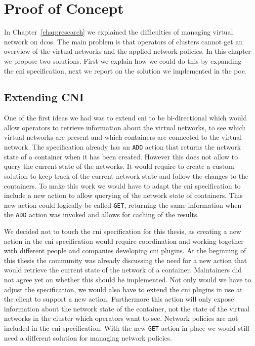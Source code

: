 \chapter{Proof of Concept}
\label{chap:proof-of-concept}
In Chapter~\ref{chap:research} we explained the difficulties of managing virtual network on \gls{dcos}. The main problem is that operators of clusters cannot get an overview of the virtual networks and the applied network policies. In this chapter we propose two solutions. First we explain how we could do this by expanding the \gls{cni} specification, next we report on the solution we implemented in the \gls{poc}. 

\section{Extending CNI}
\label{sec:expanding-cni}
One of the first ideas we had was to extend \gls{cni} to be bi-directional which would allow operators to retrieve information about the virtual networks, to see which virtual networks are present and which containers are connected to the virtual network. The specification already has an \texttt{ADD} action that returns the network state of a container when it has been created. However this does not allow to query the current state of the networks. It would require to create a custom solution to keep track of the current network state and follow the changes to the containers. To make this work we would have to adapt the \gls{cni} specification to include a new action to allow querying of the network state of containers. This new action could logically be called \texttt{GET}, returning the same information when the \texttt{ADD} action was invoked and allows for caching of the results.

We decided not to touch the \gls{cni} specification for this thesis, as creating a new action in the \gls{cni} specification would require coordination and working together with different people and companies developing \gls{cni} plugins. At the beginning of this thesis the community was already discussing the need for a new action that would retrieve the current state of the network of a container. Maintainers did not agree yet on whether this should be implemented. Not only would we have to adjust the specification, we would also have to extend the \gls{cni} plugins in use at the client to support a new action. Furthermore this action will only expose information about the network state of the container, not the state of the virtual networks in the cluster which operators want to see. Network policies are not included in the \gls{cni} specification. With the new \texttt{GET} action in place we would still need a different solution for managing network policies. 

